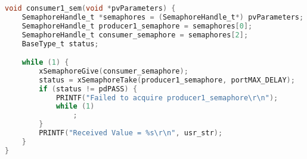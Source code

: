 \begin{lstlisting}[language=c,caption=Problem 3 Consumer 1 Task, label=list:p3_cons1]
void consumer1_sem(void *pvParameters) {
    SemaphoreHandle_t *semaphores = (SemaphoreHandle_t*) pvParameters;
    SemaphoreHandle_t producer1_semaphore = semaphores[0];
    SemaphoreHandle_t consumer_semaphore = semaphores[2];
    BaseType_t status;

    while (1) {
        xSemaphoreGive(consumer_semaphore);
        status = xSemaphoreTake(producer1_semaphore, portMAX_DELAY);
        if (status != pdPASS) {
            PRINTF("Failed to acquire producer1_semaphore\r\n");
            while (1)
                ;
        }
        PRINTF("Received Value = %s\r\n", usr_str);
    }
}
\end{lstlisting}
